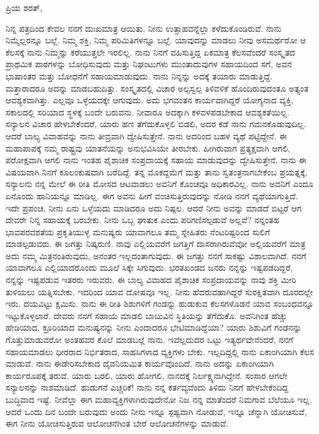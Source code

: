 \noindent
ಪ್ರಿಯ ಶರತ್,

ನಿನ್ನ ಪತ್ರದಿಂದ ಕೇವಲ ನನಗೆ ದುಃಖಮಾತ್ರ ಆಯಿತು. ನೀನು ಉತ್ಸಾಹವನ್ನೆಲ್ಲಾ ಕಳೆದುಕೊಂಡಿರುವೆ. ನಾನು ನಿಮ್ಮೆಲ್ಲರನ್ನೂ ಬಲ್ಲೆ. ನಿಮ್ಮ ಶಕ್ತಿ, ನಿಮ್ಮ ಪರಿಮಿತಿಗಳನ್ನೂ ಬಲ್ಲೆ. ಯಾವುದನ್ನು ಮಾಡಲು ನೀವು ಅಸಮರ್ಥರೋ ಆ ಕೆಲಸಕ್ಕೆ ನಾನು ನಿಮ್ಮನ್ನು ಕರೆಯುತ್ತಲೇ ಇರಲಿಲ್ಲ. ನಾನು ನಿನಗೆ ವಹಿಸುತ್ತಿದ್ದ ಏಕಮಾತ್ರ ಕೆಲಸವೆಂದರೆ ಸಂಸ್ಕೃತದ ಪ್ರಾಥಮಿಕ ಪಾಠಗಳನ್ನು ಬೋಧಿಸುವುದು ಮತ್ತು ನಿಘಂಟುಗಳು ಮುಂತಾದುವುಗಳ ಸಹಾಯದಿಂದ ಸ\enginline{-}ಗೆ, ಅವನ ಭಾಷಾಂತರ ಮತ್ತು ಬೋಧನೆಗೆ ಸಹಾಯಮಾಡುವುದು. ನಾನು ನಿನ್ನನ್ನು ಅದಕ್ಕೆ ತಯಾರು ಮಾಡುತ್ತಿದ್ದೆ. ಮತ್ತಾರಾದರೂ ಅದನ್ನು ಮಾಡಬಹುದಿತ್ತು. ಸಂಸ್ಕೃತದಲ್ಲಿ ವಿಚಾರ ಅಲ್ಪಸ್ವಲ್ಪ ತಿಳಿವಳಿಕೆ ಹೊಂದಿರುವುದಂತೂ ಅತ್ಯಂತ ಆವಶ್ಯಕವಾಗಿತ್ತು. ಎಲ್ಲವೂ ಒಳ್ಳೆಯದಕ್ಕೇ ಆಗುವುದು. ಅದು ಭಗವಂತನ ಕಾರ್ಯವಾಗಿದ್ದರೆ ಯೋಗ್ಯನಾದ ವ್ಯಕ್ತಿ, ಸಕಾಲದಲ್ಲಿ ಸರಿಯಾದ ಸ್ಥಳಕ್ಕೆ ಬಂದೇ ಬರುವನು. ನೀವಾರೂ ಅದಕ್ಕಾಗಿ ಕಳವಳಪಡಬೇಕಾದ ಆವಶ್ಯಕತೆಯಿಲ್ಲ. ಸನ್ಯಾಲನ ವಿಚಾರ ಹೇಳಬೇಕೆಂದರೆ, ಯಾರು ಹಣ ತೆಗೆದುಕೊಳ್ಳಲಿ ಬಿಡಲಿ, ಅದರ ಕಡೆ ನಾನು ಗಮನಕೊಡುವುದಿಲ್ಲ. ಆದರೆ ಬಾಲ್ಯ ವಿವಾಹವನ್ನು ನಾನು ತೀವ್ರವಾಗಿ ದ್ವೇಷಿಸುತ್ತೇನೆ. ನಾನು ಅದರಿಂದ ಬಹಳ ವ್ಯಥೆ ಪಟ್ಟಿದ್ದೇನೆ. ಈ ಮಹಾಪಾಪಕ್ಕೆ ನಮ್ಮ ರಾಷ್ಟ್ರವು ಯಾತನೆಯನ್ನು ಅನುಭವಿಸಿಯೇ ತೀರಬೇಕು. ಹೀಗಿರುವಾಗ ಪ್ರತ್ಯಕ್ಷವಾಗಿ ಆಗಲಿ, ಪರೋಕ್ಷವಾಗಿ ಆಗಲಿ ನಾನು ಇಂತಹ ಪೈಶಾಚಿಕ ಸಂಪ್ರದಾಯಕ್ಕೆ ಸಹಾಯ ಮಾಡುವುದನ್ನು ದ್ವೇಷಿಸುತ್ತೇನೆ. ನಾನು ಈ ವಿಷಯವಾಗಿ ನಿನಗೆ ಕೂಲಂಕುಷವಾಗಿ ಬರೆದಿದ್ದೆ. ತನ್ನ ಮೊಕದ್ದಮೆಗೆ ಮತ್ತು ತಾನು ಸ್ವತಂತ್ರನಾಗಬೇಕೆಂಬ ಪ್ರಯತ್ನಕ್ಕೆ, ಸನ್ಯಾಲನು ನನ್ನ ಮೇಲೆ ಈ ರೀತಿ ಮೋಸದ ಆಟವಾಡಲು ಅವನಿಗೆ ಕೊಂಚವೂ ಅಧಿಕಾರವಿಲ್ಲ. ನಾನು ಅವನಿಗೆ ಎಂದೂ ಏನೊಂದು ಹಾನಿಯನ್ನೂ ಮಾಡಿಲ್ಲ. ಈಗ ಅವನು ಹೀಗೆ ವಂಚಿಸುತ್ತಿರುವುದನ್ನು ನೋಡಿ ನನಗೆ ವ್ಯಥೆಯಾಗುತ್ತಿದೆ. ಇದೇ ಪ್ರಪಂಚ, ನೀನು ಏನು ಒಳ್ಳೆಯದು ಮಾಡಿದರೂ ಅದು ನಿಷ್ಪಲ. ಆದರೆ ನೀನು ಅವನ್ನು ಮಾಡದೆ ಬಿಟ್ಟರೆ ಆಗ ದೇವರೇ ನಿನ್ನ ಸಹಾಯಕ್ಕೆ ಬರಬೇಕು. ನೀನು ಒಬ್ಬ ಘಾತುಕ ಎಂದು ಪರಿಗಣಿಸಲ್ಪಡುವೆ ಅಲ್ಲವೆ? ನನ್ನಂತಹ ಭಾವಪರವಶತೆಯ ಪ್ರಕೃತಿಯುಳ್ಳ ಮನುಷ್ಯರು ಯಾವಾಗಲೂ ತಮ್ಮ ಸ್ನೇಹಿತರು ನೆಂಟರಿಷ್ಟರಿಂದ ಸುಲಿಗೆ ಮಾಡಲ್ಪಡುವರು. ಈ ಜಗತ್ತು ನಿಷ್ಕರುಣಿ. ನಾವು ಎಲ್ಲಿಯವರೆಗೆ ಜಗತ್ತಿಗೆ ದಾಸರಾಗಿರುವೆವೋ ಅಲ್ಲಿಯವರೆಗೆ ಮಾತ್ರ ಅದು ನಮ್ಮ ಮಿತ್ರನಂತಿರುವುದು, ಅನಂತರ ಇಲ್ಲದಂತಾಗುವುದು. ಈ ಜಗತ್ತು ನನಗೆ ಸಾಕಷ್ಟು ವಿಶಾಲವಾಗಿದೆ. ನನಗೆ ಯಾವಾಗಲೂ ಎಲ್ಲಿಯಾದರೊಂದು ಮೂಲೆ ಸಿಕ್ಕೇ ಸಿಗುವುದು. ಭರತಖಂಡದ ಜನರು ನನ್ನನ್ನು ಇಷ್ಟಪಡದಿದ್ದರೆ, ನನ್ನನ್ನು ಇಷ್ಟಪಡುವ ಇತರರು ಇರುವರು. ಈ ಬಾಲ್ಯ ವಿವಾಹದ ಪೈಶಾಚಿಕ ಸಂಪ್ರದಾಯವನ್ನು ನಾವು ಶಕ್ತಿ ಮೀರಿ ತುಳಿಯಲು ಯತ್ನಿಸಬೇಕು. ಇದರಿಂದ ಯಾವ ದೋಷವೂ ಇಲ್ಲ. ನೀನು ಹೆದರುವಹಾಗಿದ್ದರೆ ಸುರಕ್ಷಿತವಾಗಿ ದೂರದಲ್ಲೇ ಇರು. ದಯವಿಟ್ಟು ಕ್ಷಮಿಸು. ನಾನು ಈ ರೀತಿ ಶಿಶುಗಳಿಗೆ ಗಂಡನ್ನು ಹುಡುಕುವ ಕೆಲಸಗಳೊಡನೆ ಯಾವ ಸಂಬಂಧವನ್ನೂ ಇಟ್ಟುಕೊಳ್ಳಲಾರೆ. ದೇವರು ನನಗೆ ಸಹಾಯ ಮಾಡಲಿ\enginline{-} ಬಾಬುವಿನ ಸ್ಥಿತಿಯನ್ನು ತೆಗೆದುಕೊ. ಅವನಿಗಿಂತ ಹೆಚ್ಚು ಹೇಡಿಯಾದ, ಕ್ರೂರಿಯಾದ ಮನುಷ್ಯನನ್ನು ನೀನು ಎಂದಾದರೂ ಭೇಟಿಮಾಡಿದ್ದೆಯಾ? ಯಾರು ಶಿಶುವಿಗೆ ಗಂಡನನ್ನು ಗೊತ್ತುಮಾಡುವರೋ ಅಂತಹವರ ಕೊಲೆ ಮಾಡಬಲ್ಲೆ ನಾನು. ಇವೆಲ್ಲದುದರ ಒಟ್ಟು ಇತ್ಯರ್ಥವೇನೆಂದರೆ, ನನಗೆ ಸಹಾಯಮಾಡಲು ಧೀರರಾದ ನಿರ್ಭಿತರಾದ, ಸಾಹಸಿಗಳಾದ ವ್ಯಕ್ತಿಗಳು ಬೇಕು. ಇಲ್ಲದಿದ್ದಲ್ಲಿ ನಾನು ಏಕಾಂಗಿಯಾಗಿ ಕೆಲಸ ಮಾಡುವೆ. ನಾನು ಈಡೇರಿಸಬೇಕಾದ ದೈವನಿಯಮಿತ ಕಾರ್ಯವೊಂದಿದೆ. ನಾನು ಅದನ್ನು ಏಕಾಂಗಿಯಾಗಿ ಕಾರ್ಯರೂಪಕ್ಕೆ ತರುವೆ. ಯಾರು ಬರಲಿ, ಯಾರು ಹೋಗಲಿ, ನಾನದಕ್ಕೆ ನಿರ್ಲಕ್ಷ್ಯನಾಗಿದ್ದೇನೆ. ಸಂಸಾರ ಆಗಲೇ ಸನ್ಯಾಲನನ್ನು ನಾಶಮಾಡಿದೆ. ಹುಡುಗನೆ ಎಚ್ಚರಿಕೆ! ನಾನು ನನ್ನ ಕರ್ತವ್ಯವೆಂದು ತಿಳಿದು ನಿನಗೆ ಹೇಳಬೇಕೆಂದಿದ್ದ ಬುದ್ಧಿವಾದ ಇಷ್ಟೆ. ನೀವೆಲ್ಲಾ ಈಗ ಮಹಾವ್ಯಕ್ತಿಗಳಾಗಿರುವುದೇನೋ ನಿಜ\enginline{-} ನನ್ನ ಮಾತೆಂದರೆ ನಿಮಗಾವ ಬೆಲೆಯೂ ಇಲ್ಲ. ಆದರೆ ಒಂದು ದಿನ ಬಂದೇ ಬರುವುದು\enginline{-} ಅಂದು ನೀನು ಇನ್ನೂ ಸ್ಪಷ್ಟವಾಗಿ ನೋಡುವೆ, ಇನ್ನೂ ಚೆನ್ನಾಗಿ ಯೋಚಿಸುವೆ, ಈಗ ನೀನು ಯೋಚಿಸುತ್ತಿರುವ ಆಲೋಚನೆಗಿಂತ ಬೇರೆ ಆಲೋಚನೆಗಳನ್ನು ಮಾಡುವೆ.

